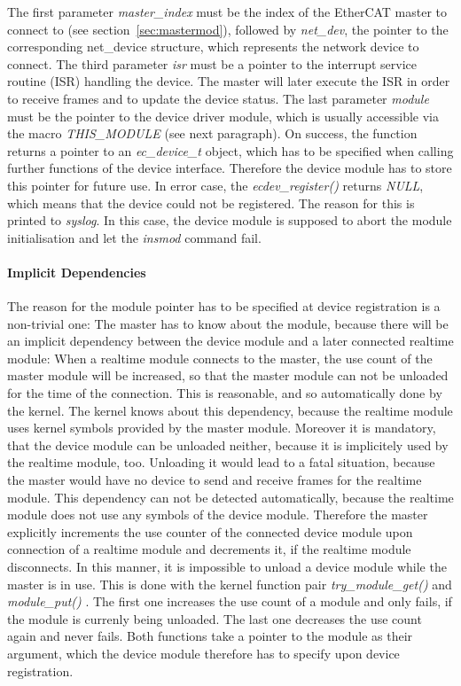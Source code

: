 \documentclass[a4paper,12pt,BCOR6mm,bibtotoc,idxtotoc]{scrbook}
\begin{document}
The first parameter \textit{master\_index} must be the index of the
EtherCAT master to connect to (see section~\ref{sec:mastermod}),
followed by \textit{net\_dev}, the pointer to the corresponding
net\_device structure, which represents the network device to connect.
The third parameter \textit{isr} must be a pointer to the interrupt
service routine (ISR) handling the device. The master will
later execute the ISR in order to receive frames and to update the
device status. The last parameter \textit{module} must be the pointer
to the device driver module, which is usually accessible via the macro
\textit{THIS\_MODULE} (see next paragraph). On success, the function
returns a pointer to an \textit{ec\_device\_t} object, which has to be
specified when calling further functions of the device interface.
Therefore the device module has to store this pointer for future use.
In error case, the \textit{ecdev\_register()} returns \textit{NULL},
which means that the device could not be registered.  The reason for
this is printed to \textit{syslog}. In this case, the
device module is supposed to abort the module initialisation and let
the \textit{insmod} command fail.

\paragraph{Implicit Dependencies}

The reason for the module pointer has to be specified at device
registration is a non-trivial one: The master has to know about the
module, because there will be an implicit dependency between the
device module and a later connected realtime module: When a realtime
module connects to the master, the use count of the master module will
be increased, so that the master module can not be unloaded for the
time of the connection. This is reasonable, and so automatically done
by the kernel. The kernel knows about this dependency, because the
realtime module uses kernel symbols provided by the master module.
Moreover it is mandatory, that the device module can be unloaded
neither, because it is implicitely used by the realtime module, too.
Unloading it would lead to a fatal situation, because the master would
have no device to send and receive frames for the realtime module.
This dependency can not be detected automatically, because the
realtime module does not use any symbols of the device module.
Therefore the master explicitly increments the use counter of the
connected device module upon connection of a realtime module and
decrements it, if the realtime module disconnects. In this manner, it
is impossible to unload a device module while the master is in use.
This is done with the kernel function pair \textit{try\_module\_get()}
 and
\textit{module\_put()} . The
first one increases the use count of a module and only fails, if the
module is currenly being unloaded. The last one decreases the use
count again and never fails. Both functions take a pointer to the
module as their argument, which the device module therefore has to
specify upon device registration.
\end{document}
